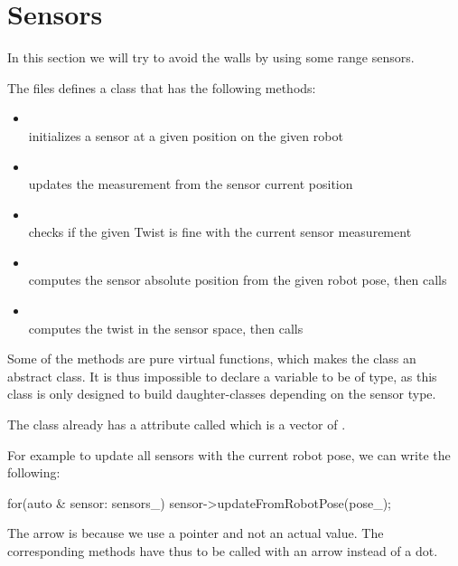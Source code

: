 \documentclass{ecnreport}
\begin{document}
%  
\newpage

\section{Sensors}

In this section we will try to avoid the walls by using some range sensors.

The  files defines a  class that has the following methods:
\begin{itemize}
\item {}\\initializes a sensor at a given position on the given robot
\item {}\\ updates the measurement from the sensor current position
\item {}\\ checks if the given Twist is fine with the current sensor measurement
\item {}\\ computes the sensor absolute position from the given robot pose, then calls 
\item {}\\ computes the twist in the sensor space, then calls 
\end{itemize}
Some of the methods are pure virtual functions, which makes the  class an abstract class.
It is thus impossible to declare a variable to be of  type, as this class is only designed to build daughter-classes depending on the sensor type.

The  class already has a attribute called  which is a vector of .

For example to update all sensors with the current robot pose, we can write the following:
\begin{cppcode}
    for(auto & sensor: sensors_)
	sensor->updateFromRobotPose(pose_);
\end{cppcode}The arrow is because we use a pointer and not an actual value. The corresponding methods have thus to be 
called with an arrow instead of a dot.
\end{document}
